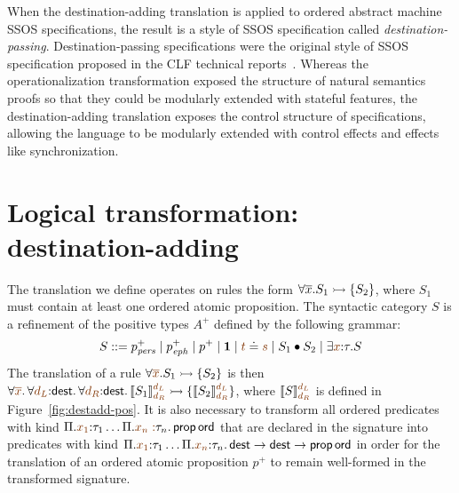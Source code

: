 When the destination-adding translation is applied to ordered abstract
machine SSOS specifications, the result is a style of SSOS
specification called {\it destination-passing}. Destination-passing
specifications were the original style of SSOS specification proposed
in the CLF technical reports~\cite{cervesato02concurrent}. Whereas the
operationalization transformation exposed the structure of natural
semantics proofs so that they could be modularly extended with
stateful features, the destination-adding translation exposes the
control structure of specifications, allowing the language to be
modularly extended with control effects and effects like
synchronization.

\section{Logical transformation: destination-adding}
\label{sec:destination-adding}

The translation we define operates on rules the form $\forall
\overline{x}. S_1 \rightarrowtail \{ S_2 \}$, where $S_1$ must contain at least
one ordered atomic proposition. The syntactic category $S$ is
a refinement of the positive types $A^+$ defined by the following
grammar:
\[
S ::= p^+_\mpers \mid p^+_\meph \mid p^+ \mid \one
\mid \lf{t} \doteq \lf{s} \mid S_1 \fuse S_2 \mid \exists \lf{x}{:}\tau. S
\]
The translation of a rule $\forall \lf{\overline{x}}. S_1 \lefti \{ S_2 \}$
is then $\forall \lf{\overline{x}}.\, \forall \lf{d_L}{:}{\sf dest}.\, \forall
\lf{d_R}{:}{\sf dest}.\, \llbracket S_1 \rrbracket^{\lf{d_L}}_{\lf{d_R}} \lefti \{
\llbracket S_2 \rrbracket^{\lf{d_L}}_{\lf{d_R}} \}$, where $\llbracket S
\rrbracket^{\lf{d_L}}_{\lf{d_R}}$ is defined in Figure~\ref{fig:destadd-pos}. It
is also necessary to transform all ordered predicates with kind
$\Pi. \lf{x_1}{:}\tau_1\ldots \Pi.\lf{x_n{}:}\tau_n.\,{\sf prop\,ord}$ that are
declared in the signature into predicates with kind
$\Pi. \lf{x_1}{:}\tau_1\ldots \Pi.\lf{x_n}{:}\tau_n.\, {\sf dest} \rightarrow
{\sf dest} \rightarrow {\sf prop\,ord}$ in order for the translation
of an ordered atomic proposition $p^+$ to remain well-formed in
the transformed signature.

